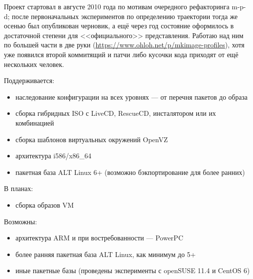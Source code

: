 \documentclass[10pt, a5paper]{article}
\begin{document}
Проект стартовал в августе 2010 года по мотивам очередного рефакторинга m-p-d; после первоначальных экспериментов по определению траектории тогда же осенью был опубликован черновик, а ещё через год состояние оформилось в достаточной степени для <<официального>> представления.  Работаю над ним по большей части в две руки (\url{https://www.ohloh.net/p/mkimage-profiles}), хотя уже появился второй коммитящий и патчи либо кусочки кода приходят от ещё нескольких человек.

Поддерживается:

\begin{itemize}
  \item наследование конфигурации на всех уровнях --- от перечня пакетов до образа
  \item сборка гибридных ISO с LiveCD, RescueCD, инсталятором или их комбинацией
  \item сборка шаблонов виртуальных окружений OpenVZ
  \item архитектура i586/x86\_64
  \item пакетная база ALT Linux 6+ (возможно бэкпортирование для более ранних)
\end{itemize}

В планах:

\begin{itemize}
  \item сборка образов VM
\end{itemize}

Возможны:

\begin{itemize}
  \item архитектура ARM и при востребованности --- PowerPC
  \item более ранняя пакетная база ALT Linux, как минимум до 5+
  \item иные пакетные базы (проведены эксперименты с openSUSE 11.4 и CentOS 6)
\end{itemize}
\end{document}
